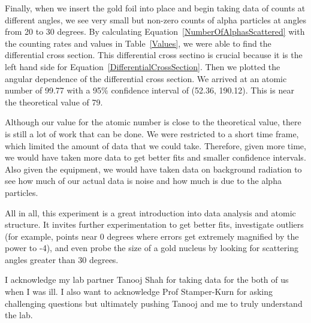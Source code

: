 Finally, when we insert the gold foil into place and begin taking data of counts at different angles, we see very small but non-zero counts of alpha particles at angles from 20 to 30 degrees. By calculating Equation~\ref{NumberOfAlphasScattered} with the counting rates and values in Table~\ref{Values}, we were able to find the differential cross section. This differential cross sectino is crucial because it is the left hand side for Equation~\ref{DifferentialCrossSection}. Then we plotted the angular dependence of the differential cross section. We arrived at an atomic number of 99.77 with a 95$\%$ confidence interval of (52.36, 190.12). This is near the theoretical value of 79. 

Although our value for the atomic number is close to the theoretical value, there is still a lot of work that can be done. We were restricted to a short time frame, which limited the amount of data that we could take. Therefore, given more time, we would have taken more data to get better fits and smaller confidence intervals. Also given the equipment, we would have taken data on background radiation to see how much of our actual data is noise and how much is due to the alpha particles. 

All in all, this experiment is a great introduction into data analysis and atomic structure. It invites further experimentation to get better fits, investigate outliers (for example, points near 0 degrees where errors get extremely magnified by the power to -4), and even probe the size of a gold nucleus by looking for scattering angles greater than 30 degrees. 




\begin{acknowledgments} I acknowledge my lab partner Tanooj Shah for taking data for the both of us when I was ill. I also want to acknowledge Prof Stamper-Kurn for asking challenging questions but ultimately pushing Tanooj and me to truly understand the lab.
\end{acknowledgments}


